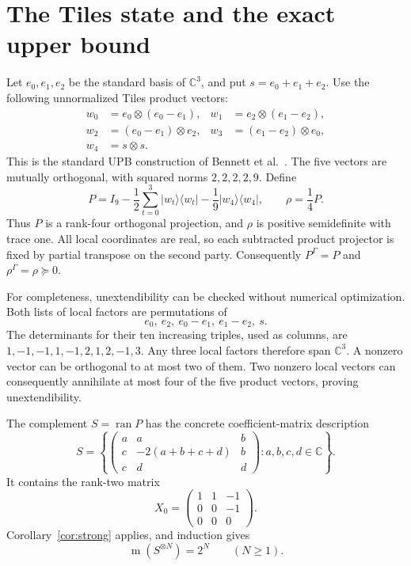 \documentclass[11pt]{article}
\theoremstyle{definition}
\newcommand{\C}{\mathbb C}
\newcommand{\ran}{\operatorname{ran}}
\newcommand{\minrank}{\operatorname{m}}
\newcommand{\ket}[1]{\lvert #1\rangle}
\newcommand{\bra}[1]{\langle #1\rvert}
\newcommand{\pure}[1]{\ket{#1}\!\bra{#1}}
\begin{document}
\section{The Tiles state and the exact upper bound}

Let $e_0,e_1,e_2$ be the standard basis of $\C^3$, and put
$s=e_0+e_1+e_2$. Use the following unnormalized Tiles product vectors:
\begin{align*}
 w_0&=e_0\otimes(e_0-e_1),&
 w_1&=e_2\otimes(e_1-e_2),\\
 w_2&=(e_0-e_1)\otimes e_2,&
 w_3&=(e_1-e_2)\otimes e_0,\\
 w_4&=s\otimes s.
\end{align*}
This is the standard UPB construction of Bennett et al.\ \cite{bennett1999}.
The five vectors are mutually orthogonal, with squared norms $2,2,2,2,9$.
Define
\begin{equation}\label{eq:tilesP}
 P=I_9-\frac12\sum_{t=0}^{3}\pure{w_t}-\frac19\pure{w_4},
 \qquad \rho=\frac14P.
\end{equation}
Thus $P$ is a rank-four orthogonal projection, and $\rho$ is positive
semidefinite with trace one. All local coordinates are real, so each
subtracted product projector is fixed by partial transpose on the second
party. Consequently $P^\Gamma=P$ and $\rho^\Gamma=\rho\succeq0$.

For completeness, unextendibility can be checked without numerical
optimization. Both lists of local factors are permutations of
\[
 e_0,\ e_2,\ e_0-e_1,\ e_1-e_2,\ s.
\]
The determinants for their ten increasing triples, used as columns, are
$1,-1,-1,1,-1,2,1,2,-1,3$. Any three local factors therefore span $\C^3$.
A nonzero vector can be orthogonal to at most two of them. Two nonzero local
vectors can consequently annihilate at most four of the five product
vectors, proving unextendibility.

The complement $S=\ran P$ has the concrete coefficient-matrix description
\begin{equation}\label{eq:tilesS}
 S=\left\{
 \begin{pmatrix}
 a&a&b\\ c&-2(a+b+c+d)&b\\ c&d&d
 \end{pmatrix}:a,b,c,d\in\C\right\}.
\end{equation}
It contains the rank-two matrix
\[
 X_0=\begin{pmatrix}1&1&-1\\0&0&-1\\0&0&0\end{pmatrix}.
\]
Corollary~\ref{cor:strong} applies, and induction gives
\begin{equation}\label{eq:support}
 \minrank(S^{\otimes N})=2^N\qquad(N\ge1).
\end{equation}
\end{document}
